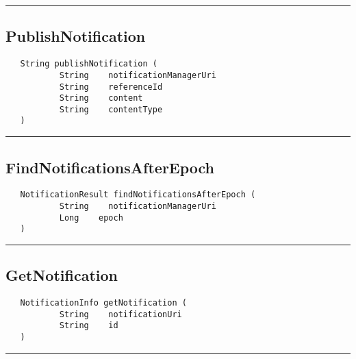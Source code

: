 \rule{15cm}{2pt}
\subsection{PublishNotification}
\label{Api:PublishNotification}
\begin{verbatim}
   String publishNotification (
           String    notificationManagerUri
           String    referenceId
           String    content
           String    contentType
   )
\end{verbatim}



\rule{15cm}{2pt}
\subsection{FindNotificationsAfterEpoch}
\label{Api:FindNotificationsAfterEpoch}
\begin{verbatim}
   NotificationResult findNotificationsAfterEpoch (
           String    notificationManagerUri
           Long    epoch
   )
\end{verbatim}



\rule{15cm}{2pt}
\subsection{GetNotification}
\label{Api:GetNotification}
\begin{verbatim}
   NotificationInfo getNotification (
           String    notificationUri
           String    id
   )
\end{verbatim}



\rule{15cm}{2pt}
